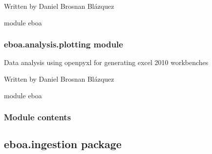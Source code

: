 Written by Daniel Brosnan Blázquez

module eboa

\begin{fulllineitems}
\label{\detokenize{eboa.analysis:eboa.analysis.functions.adjust_column_width}}
\end{fulllineitems}



\subsubsection{eboa.analysis.plotting module}
\label{\detokenize{eboa.analysis:module-eboa.analysis.plotting}}\label{\detokenize{eboa.analysis:eboa-analysis-plotting-module}}
Data analysis using openpyxl for generating excel 2010 workbenches

Written by Daniel Brosnan Blázquez

module eboa

\begin{fulllineitems}
\label{\detokenize{eboa.analysis:eboa.analysis.plotting.generate_gantt}}
\end{fulllineitems}



\subsubsection{Module contents}
\label{\detokenize{eboa.analysis:module-eboa.analysis}}\label{\detokenize{eboa.analysis:module-contents}}

\subsection{eboa.ingestion package}
\label{\detokenize{eboa.ingestion:eboa-ingestion-package}}\label{\detokenize{eboa.ingestion::doc}}

